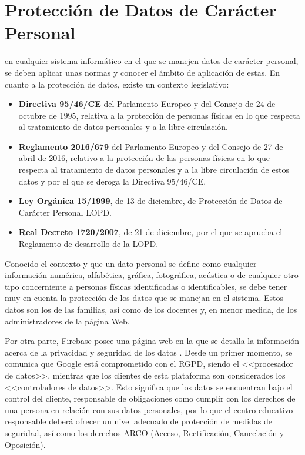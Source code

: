 \chapter{Protección de Datos de Carácter Personal}
\label{chap:lopd}
 en cualquier sistema informático en el que se manejen datos de carácter personal, se deben aplicar unas normas y conocer el ámbito de aplicación de estas.  En cuanto a la protección de datos, existe un contexto legislativo:

\begin{itemize}
	\item \textbf{Directiva 95/46/CE} del Parlamento Europeo y del Consejo de 24 de octubre de 1995, relativa a la protección de personas físicas en lo que respecta al tratamiento de datos personales y a la libre circulación.
	\item \textbf{Reglamento 2016/679} del Parlamento Europeo y del Consejo de 27 de abril de 2016, relativo a la protección de las personas físicas en lo que respecta al tratamiento de datos personales y a la libre circulación de estos datos y por el que se deroga la Directiva 95/46/CE.
	\item \textbf{Ley Orgánica 15/1999}, de 13 de diciembre, de Protección de Datos de Carácter Personal \acf{LOPD}.
	\item \textbf{Real Decreto 1720/2007}, de 21 de diciembre, por el que se aprueba el Reglamento de desarrollo de la \acs{LOPD}.
\end{itemize}

Conocido el contexto y que un dato personal se define como cualquier información numérica, alfabética, gráfica, fotográfica, acústica o de cualquier otro tipo concerniente a personas físicas identificadas o identificables, se debe tener muy en cuenta la protección de los datos que se manejan en el sistema. Estos datos son los de las familias, así como de los docentes y, en menor medida, de los administradores de la página Web.

Por otra parte, Firebase posee una página web en la que se detalla la información acerca de la privacidad y seguridad de los datos \cite{Firebase2018}. Desde un primer momento, se comunica que Google está comprometido con el \acs{RGPD}, siendo el <<procesador de datos>>, mientras que los clientes de esta plataforma son considerados los <<controladores de datos>>. Esto significa que los datos se encuentran bajo el control del cliente, responsable de obligaciones como cumplir con los derechos de una persona en relación con sus datos personales, por lo que el centro educativo responsable deberá ofrecer un nivel adecuado de protección de medidas de seguridad, así como los derechos ARCO (Acceso, Rectificación, Cancelación y Oposición).